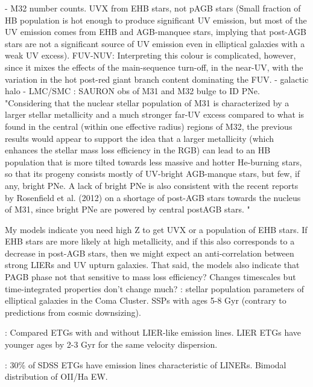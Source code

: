 

\citet{Rosenfield+2012}

\citet{Brown+2008} - M32 number counts. UVX from EHB stars, not pAGB stars (Small fraction of HB population is hot enough to produce significant UV emission, but most of the UV emission comes from EHB and AGB-manquee stars, implying that post-AGB stars are not a significant source of UV emission even in elliptical galaxies with a weak UV excess).
\citet{Smith+2012} FUV-NUV: Interpreting this colour is complicated, however, since it mixes the effects of the main-sequence turn-off, in the near-UV, with the variation in the hot post-red giant branch content dominating the FUV.
\citet{Weston+2010} - galactic halo
\citet{Girardi+2007} - LMC/SMC
\citet{Pastorello+2013}: SAURON obs of M31 and M32 bulge to ID PNe.
"Considering that the nuclear stellar population of M31 is characterized by a larger stellar metallicity and a much stronger far-UV excess compared to what is found in the central (within one effective radius) regions of M32, the previous results would appear to support the idea that a larger metallicity (which enhances the stellar mass loss efficiency in the RGB) can lead to an HB population that is more tilted towards less massive and hotter He-burning stars, so that its progeny consists mostly of UV-bright AGB-manque stars, but few, if any, bright PNe. A lack of bright PNe is also consistent with the recent reports by Rosenfield et al. (2012) on a shortage of post-AGB stars towards the nucleus of M31, since bright PNe are powered by central postAGB stars. "

My models indicate you need high Z to get UVX or a population of EHB stars. If EHB stars are more likely at high metallicity, and if this also corresponds to a decrease in post-AGB stars, then we might expect an anti-correlation between strong LIERs and UV upturn galaxies.
That said, the models also indicate that PAGB phase not that sensitive to mass loss efficiency? Changes timescales but time-integrated properties don't change much?
\citet{Trager+2008}: stellar population parameters of elliptical galaxies in the Coma Cluster. SSPs with ages 5-8 Gyr (contrary to predictions from cosmic downsizing).

\citet{Graves+2007}: Compared ETGs with and without LIER-like emission lines. LIER ETGs have younger ages by 2-3 Gyr for the same velocity dispersion.

\citet{Yan+2006}: 30\% of SDSS ETGs have emission lines characteristic of LINERs. Bimodal distribution of OII/Ha EW.

